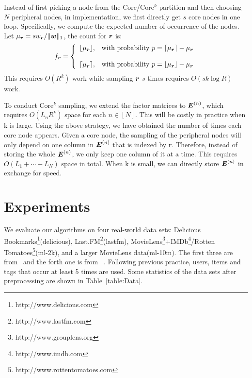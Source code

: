 \documentclass[letterpaper]{article}
\newcommand{\V}[1]{{\boldsymbol{{\MakeLowercase{#1}}}}}
\newcommand{\M}[1]{{\boldsymbol{{\MakeUppercase{#1}}}}}
\newcommand{\FacMat}[2]{\M{#1}^{(#2)}}
\newcommand{\norm}[2]{\|#1\|_{#2}}
\newcommand{\Table}[1]{Table~\ref{table:#1}}
\begin{document}
Instead of first picking a node from the Core/Core$^k$ partition 
and then choosing $N$ peripheral nodes, 
in implementation, we first directly get $s$ core nodes in one loop. 
Specifically, we compute the expected number of occurrence of the nodes.
Let $\mu_{\V{r}}=sw_\V{r}/\norm{\V{w}}{1}$, the count for $\V{r}$ is:
\begin{equation}f_\V{r}=
    \left\{
      \begin{array}{ll}
        \lfloor \mu_{\V{r}} \rfloor,
        & \hbox {with probability $p=\lceil \mu_{\V{r}} \rceil - \mu_{\V{r}}$} \\\\
        \lceil \mu_{\V{r}} \rceil,
        & \hbox{with probability $p=\lfloor \mu_{\V{r}} \rfloor - \mu_{\V{r}}$}
      \end{array}
    \right.
\end{equation}
This requires $O(R^k)$ work while sampling $\V{r}$ $s$ times requires $O(sk\log R)$ work.

To conduct Core$^k$ sampling, 
we extend the factor matrices to $\FacMat{E}{n}$,
which requires $O(L_nR^k)$ space for each $n\in[N]$.
This will be costly in practice when k is large. 
Using the above strategy, we have obtained the number of times each core node appears. 
Given a core node, the sampling of the peripheral nodes 
will only depend on one column in $\FacMat{E}{n}$ that is indexed by $\boldsymbol{r}$. 
Therefore, instead of storing the whole $\FacMat{E}{n}$, 
we only keep one column of it at a time. 
This requires $O(L_1+\cdots+L_N)$ space in total.
When k is small, we can directly store $\FacMat{E}{n}$ in exchange for speed.
\section{Experiments}
%
%
%
%
%
We evaluate our algorithms on four real-world data sets:
Delicious Bookmarks\footnote{http://www.delicious.com}(delicious),
Last.FM\footnote{http://www.lastfm.com}(lastfm),
MovieLens\footnote{http://www.grouplens.org}+IMDb\footnote{http://www.imdb.com}/Rotten Tomatoes\footnote{http://www.rottentomatoes.com}(ml-2k),
and a larger MovieLens data(ml-10m). 
The first three are from~\cite{Cantador:RecSys2011} and the forth one is from ~\cite{Harper2015}.
Following previous practice, users, items and tags that occur at least 5 times are used. 
Some statistics of the data sets after preprocessing are shown in \Table{Data}.
\end{document}
